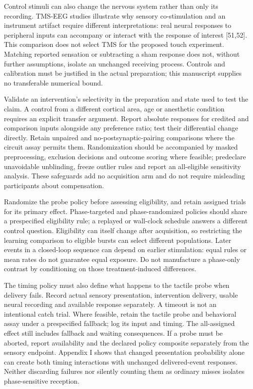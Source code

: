 \documentclass[
  american,
  11pt,
  letterpaper,
]{article}
\begin{document}
Control stimuli can also change the nervous system rather than only its recording. TMS-EEG studies illustrate why sensory co-stimulation and an instrument artifact require different interpretations: real neural responses to peripheral inputs can accompany or interact with the response of interest {[}51,52{]}. This comparison does not select TMS for the proposed touch experiment. Matching reported sensation or subtracting a sham response does not, without further assumptions, isolate an unchanged receiving process. Controls and calibration must be justified in the actual preparation; this manuscript supplies no transferable numerical bound.

Validate an intervention's selectivity in the preparation and state used to test the claim. A control from a different cortical area, age or anesthetic condition requires an explicit transfer argument. Report absolute responses for credited and comparison inputs alongside any preference ratio; test their differential change directly. Retain unpaired and no-postsynaptic-pairing comparisons where the circuit assay permits them. Randomization should be accompanied by masked preprocessing, exclusion decisions and outcome scoring where feasible; predeclare unavoidable unblinding, freeze outlier rules and report an all-eligible sensitivity analysis. These safeguards add no acquisition arm and do not require misleading participants about compensation.

Randomize the probe policy before assessing eligibility, and retain assigned trials for its primary effect. Phase-targeted and phase-randomized policies should share a prespecified eligibility rule; a replayed or wall-clock schedule answers a different control question. Eligibility can itself change after acquisition, so restricting the learning comparison to eligible bursts can select different populations. Later events in a closed-loop sequence can depend on earlier stimulation: equal rules or mean rates do not guarantee equal exposure. Do not manufacture a phase-only contrast by conditioning on those treatment-induced differences.

The timing policy must also define what happens to the tactile probe when delivery fails. Record actual sensory presentation, intervention delivery, usable neural recording and available response separately. A timeout is not an intentional catch trial. Where feasible, retain the tactile probe and behavioral assay under a prespecified fallback; log its input and timing. The all-assigned effect still includes fallback and waiting consequences. If a probe must be aborted, report availability and the declared policy composite separately from the sensory endpoint. Appendix I shows that changed presentation probability alone can create both timing interactions with unchanged delivered-event responses. Neither discarding failures nor silently counting them as ordinary misses isolates phase-sensitive reception.
\end{document}
